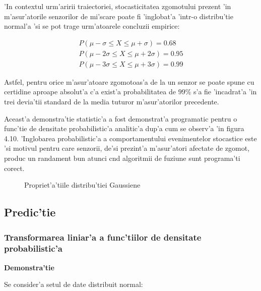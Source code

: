 \documentclass[12pt,a4paper,twoside]{report}
\begin{document}
\vspace{5px}

'In contextul urm'aririi traiectoriei, stocasticitatea zgomotului prezent 'in m'asur'atorile senzorilor de mi'scare poate fi 'inglobat'a 'intr-o distribu'tie normal'a 'si se pot trage urm'atoarele concluzii empirice: 

\begin{gather}
    P(\mu - \sigma \leq X \leq \mu + \sigma) = 0.68 \\
    P(\mu - 2\sigma \leq X \leq \mu + 2\sigma) = 0.95 \\
    P(\mu - 3\sigma \leq X \leq \mu + 3\sigma) = 0.99
\end{gather}

Astfel, pentru orice m'asur'atoare zgomotoas'a de la un senzor se poate spune cu certidine aproape absolut'a c'a exist'a probabilitatea de $99 \%$ s'a fie 'incadrat'a 'in trei devia'tii standard de la media tuturor m'asur'atorilor precedente. 

\vspace{5px}

Aceast'a demonstra'tie statistic'a a fost demonstrat'a programatic pentru o func'tie de densitate probabilistic'a analitic'a dup'a cum se observ'a 'in figura 4.10. 'Inglobarea probabilistic'a a comportamentului evenimentelor stocastice este 'si motivul pentru care senzorii, de'si prezint'a m'asur'atori afectate de zgomot, produc un randament bun atunci c\ia nd algoritmii de fuziune sunt programa'ti corect.

\begin{figure}[h]
\centering
  
  \caption{Propriet'a'tiile distribu'tiei Gaussiene}
\end{figure}

\subsection{Predic'tie}

\vspace{5px}

\subsubsection{Transformarea liniar'a a func'tiilor de densitate probabilistic'a}

\vspace{5px}

\textbf{Demonstra'tie}

Se consider'a setul de date distribuit normal:
\end{document}
